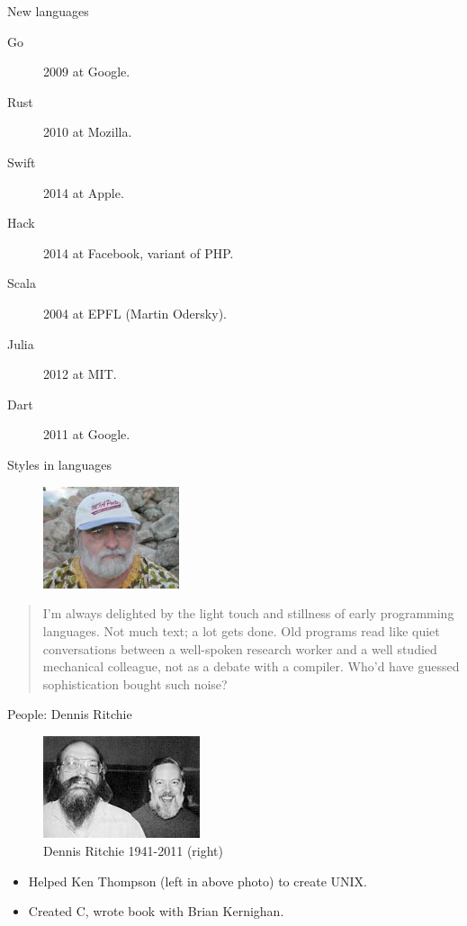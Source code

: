 \begin{frame}{New languages}
  \begin{description}
    \item[Go] 2009 at Google. 
    \item[Rust] 2010 at Mozilla.
    \item[Swift] 2014 at Apple.
    \item[Hack] 2014 at Facebook, variant of PHP.
    \item[Scala] 2004 at EPFL (Martin Odersky).
    \item[Julia] 2012 at MIT.
    \item[Dart] 2011 at Google.
  \end{description}
\end{frame}


\begin{frame}{Styles in languages}
  \begin{figure}
    \includegraphics[height=3cm]{img/richard-gabriel.jpg}
  \end{figure}
  \begin{quote}
    I'm always delighted by the light touch and stillness of early programming languages.
    Not much text; a lot gets done.
    Old programs read like quiet conversations between a well-spoken research worker and a well studied mechanical colleague, not as a debate with a compiler.
    Who'd have guessed sophistication bought such noise? \\
    \hspace*{}
  \end{quote}

\end{frame}

\begin{frame}{People: Dennis Ritchie}
  \begin{figure}
    \includegraphics[height=3cm]{img/ritchie-thompson.jpg}
    \caption*{Dennis Ritchie 1941-2011 (right)}
  \end{figure}
  \begin{itemize}
    \item Helped Ken Thompson (left in above photo) to create UNIX.
    \item Created C, wrote book with Brian Kernighan.
  \end{itemize}
\end{frame}

